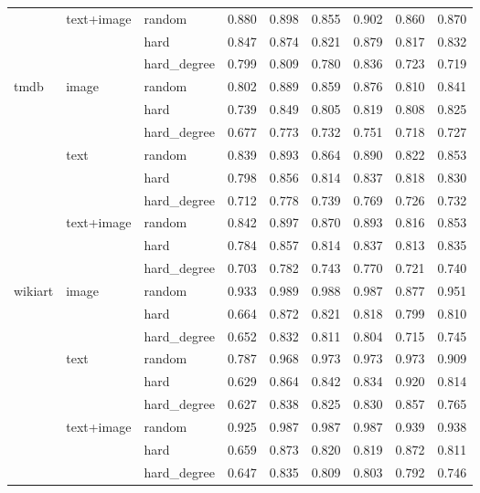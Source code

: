 \begin{table}[ht]
\begin{tabular}{lllcccccc}
         & text+image       & random         & 0.880 & 0.898 & 0.855 & 0.902 & 0.860 & 0.870 \\
         &                  & hard           & 0.847 & 0.874 & 0.821 & 0.879 & 0.817 & 0.832 \\
         &                  & hard\_degree   & 0.799 & 0.809 & 0.780 & 0.836 & 0.723 & 0.719 \\
\midrule
tmdb     & image            & random         & 0.802 & 0.889 & 0.859 & 0.876 & 0.810 & 0.841 \\
         &                  & hard           & 0.739 & 0.849 & 0.805 & 0.819 & 0.808 & 0.825 \\
         &                  & hard\_degree   & 0.677 & 0.773 & 0.732 & 0.751 & 0.718 & 0.727 \\
         & text             & random         & 0.839 & 0.893 & 0.864 & 0.890 & 0.822 & 0.853 \\
         &                  & hard           & 0.798 & 0.856 & 0.814 & 0.837 & 0.818 & 0.830 \\
         &                  & hard\_degree   & 0.712 & 0.778 & 0.739 & 0.769 & 0.726 & 0.732 \\
         & text+image       & random         & 0.842 & 0.897 & 0.870 & 0.893 & 0.816 & 0.853 \\
         &                  & hard           & 0.784 & 0.857 & 0.814 & 0.837 & 0.813 & 0.835 \\
         &                  & hard\_degree   & 0.703 & 0.782 & 0.743 & 0.770 & 0.721 & 0.740 \\
\midrule
wikiart  & image            & random         & 0.933 & 0.989 & 0.988 & 0.987 & 0.877 & 0.951 \\
         &                  & hard           & 0.664 & 0.872 & 0.821 & 0.818 & 0.799 & 0.810 \\
         &                  & hard\_degree   & 0.652 & 0.832 & 0.811 & 0.804 & 0.715 & 0.745 \\
         & text             & random         & 0.787 & 0.968 & 0.973 & 0.973 & 0.973 & 0.909 \\
         &                  & hard           & 0.629 & 0.864 & 0.842 & 0.834 & 0.920 & 0.814 \\
         &                  & hard\_degree   & 0.627 & 0.838 & 0.825 & 0.830 & 0.857 & 0.765 \\
         & text+image       & random         & 0.925 & 0.987 & 0.987 & 0.987 & 0.939 & 0.938 \\
         &                  & hard           & 0.659 & 0.873 & 0.820 & 0.819 & 0.872 & 0.811 \\
         &                  & hard\_degree   & 0.647 & 0.835 & 0.809 & 0.803 & 0.792 & 0.746 \\
\bottomrule
\end{tabular}
\end{table}
